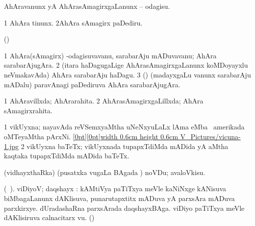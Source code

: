 {{{{{\noindent
\gl{\sakirx}
\bmng
AhAravanunx yA AhArasAmagirxgaLanunx -- odagisu. 
\emng

\noindent 
\gl{\akirx}
\expl{}
\bmng
\bnum
\num{1} AhAra tinunx. 
\num{2}AhAra sAmagirx paDediru. 
\enum
\emng
\eentry

\bentry
{} 
\gl{\nA}
\expl{}
\bmng
 (\ame)  
\emng
\eentry

\bentry
{} 
\gl{\nA}
\expl{}
\bmng
\bnum
\num{1} AhAra(sAmagirx) -odagisuvavanu, sarabarAju mADuvavanu; AhAra sarabarAjugAra. 
\num{2} (itara haDagugaLige AhArasAmagirxgaLanunx koMDoyayxlu neVmakavAda) AhAra sarabarAju haDagu. 
\hypertarget{victualler(3)}{} 
\num{3} (\birx) (madayxgaLu \mo vanunx sarabarAju mADalu) paravAnagi paDediruva AhAra sarabarAjugAra. 
\enum
\emng

\noindent 
\gl{\pagu}
\expl{}
\bmng
\emng
\eentry

\bentry
{}
\gl{\gu}
\bmng
\bnum
\num{1} AhAravillxda; AhArarahita. 
\num{2} AhArasAmagirxgaLillxda; AhAra sAmagirxrahita. 
\enum
\emng
\eentry

\bentry
{} 
\gl{\nA}
\bmng
\bnum
\num{1} vikUyxna; nayavAda reVSemxyaMtha uNeNxyuLaLx lAma eMba \da\ amerikada oMTeyaMtha pArxNi. \quad \hyperlink{vicuna-1figure}{\raisebox{-0.15cm}[0pt][0pt]{\pdfimage width 0.6cm height 0.6cm {V_Pictures/vicuna-1.jpg}}} 
\num{2} vikUyxna baTeTx; vikUyxnada tupapxTdiMda mADida yA aMtha kaqtaka tupapxTdiMda mADida baTeTx. 
\enum
\emng
\eentry

\bentry 
{} 
\gl{\sakirx}
\expl{\Latin }
\bmng
 (vidhayxthaRka) (pusatxka \mo vugaLa BAgada \vi) noVDu; avaloVkisu. 
\emng
\eentry

\bentry
{} 
\gl{\kirxvi}
\expl{}
\bmng
\emng
\eentry

\bentry
{} 
\gl{\nA}(\bava\ ). 
\bmng
 viDiyoV; daqshayx : 
\banum
{} kAMtiVya paTiTxya meVle kaNiNxge kANisuva biMbagaLanunx dAKlisuva, punarutapxtitx mADuva yA parxsAra mADuva parxkirxye. 
 dUradashaRna parxsArada daqshayxBAga. 
 viDiyo paTiTxya meVle dAKlisiruva calnacitarx \mo vu. 
 (\AmA)  
\eanum
\emng
\eentry

}}}}}
